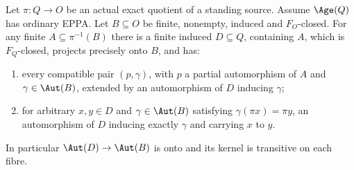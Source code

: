 \begin{lemma}
\label{lem:acf-owner-provider}
Let \(\pi:Q\to O\) be an actual exact quotient
of a standing source.  Assume \(\Age(Q)\) has ordinary EPPA.
Let \(B\subseteq O\)
be finite, nonempty, induced and \(F_O\)-closed.
For any finite \(A\subseteq\pi^{-1}(B)\) there
is a finite induced \(D\subseteq Q\), containing
\(A\), which is \(F_Q\)-closed, projects
precisely onto \(B\), and has:
\begin{enumerate}
\item every compatible pair \((p,\gamma)\),
  with \(p\) a partial automorphism of \(A\)
  and \(\gamma\in\Aut(B)\), extended by an
  automorphism of \(D\) inducing \(\gamma\);
\item for arbitrary \(x,y\in D\) and
  \(\gamma\in\Aut(B)\) satisfying
  \(\gamma(\pi x)=\pi y\), an automorphism
  of \(D\) inducing exactly \(\gamma\)
  and carrying \(x\) to \(y\).
\end{enumerate}
In particular \(\Aut(D)\to\Aut(B)\) is onto
and its kernel is transitive on each fibre.
\end{lemma}
